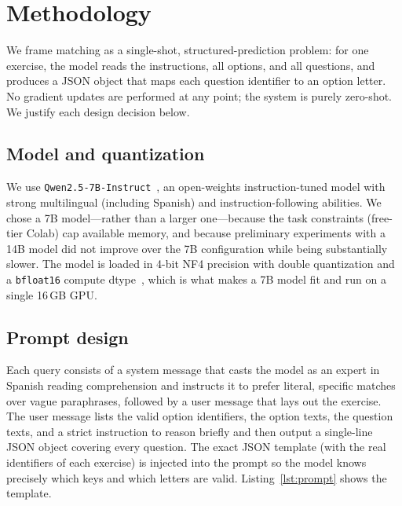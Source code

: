 \documentclass{ceurart}   %
\begin{document}
\section{Methodology}
\label{sec:method}
We frame matching as a single-shot, structured-prediction problem: for one
exercise, the model reads the instructions, all options, and all questions,
and produces a JSON object that maps each question identifier to an option
letter. No gradient updates are performed at any point; the system is purely
zero-shot. We justify each design decision below.

\subsection{Model and quantization}
We use \texttt{Qwen2.5-7B-Instruct}~\cite{qwen25}, an open-weights
instruction-tuned model with strong multilingual (including Spanish) and
instruction-following abilities. We chose a 7B model---rather than a larger
one---because the task constraints (free-tier Colab) cap available memory,
and because preliminary experiments with a 14B model did not improve over
the 7B configuration while being substantially slower. The model is loaded
in 4-bit NF4 precision with double quantization and a \texttt{bfloat16}
compute dtype~\cite{dettmers2023qlora}, which is what makes a 7B model fit
and run on a single 16\,GB GPU.

\subsection{Prompt design}
Each query consists of a system message that casts the model as an expert in
Spanish reading comprehension and instructs it to prefer literal, specific
matches over vague paraphrases, followed by a user message that lays out the
exercise. The user message lists the valid option identifiers, the option
texts, the question texts, and a strict instruction to reason briefly and
then output a single-line JSON object covering every question. The exact JSON
template (with the real identifiers of each exercise) is injected into the
prompt so the model knows precisely which keys and which letters are valid.
Listing~\ref{lst:prompt} shows the template.
\end{document}
